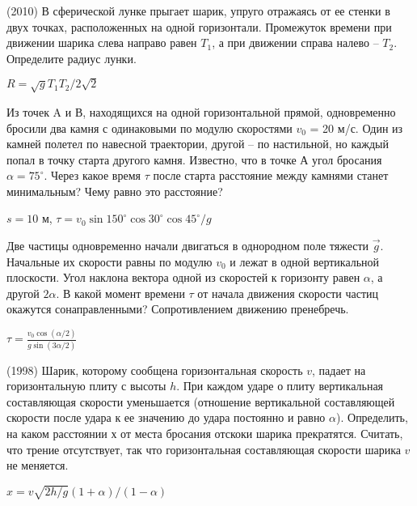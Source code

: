 \begin{ex}
(2010) В сферической лунке прыгает шарик, упруго отражаясь от ее стенки в двух точках, расположенных на одной горизонтали. Промежуток времени при движении шарика слева направо равен $T_{1}$, а при движении справа налево -- $T_2$. Определите радиус лунки.
\begin{ans}
$R = \sqrt{g} T_1 T_2 /2\sqrt{2}$
\end{ans}
\end{ex}

\begin{ex}
Из точек A и В, находящихся на одной горизонтальной прямой, одновременно бросили два камня с одинаковыми по модулю скоростями $v_0$ = 20 м/с. 
Один из камней полетел по навесной траектории, другой -- по настильной, но каждый попал в точку старта другого камня. 
Известно, что в точке А угол бросания $\alpha = 75^{\circ}$. 
Через какое время $\tau$ после старта расстояние между камнями станет минимальным? Чему равно это расстояние?
\begin{ans}
$s = 10$ м, $\tau = v_0 \sin 150^{\circ} \cos 30^{\circ} \cos 45^{\circ} /g$
\end{ans}
\end{ex}

\begin{ex}
Две частицы одновременно начали двигаться в однородном поле тяжести $\vec g$. Начальные их скорости равны по модулю $v_0$ и лежат в одной вертикальной плоскости. Угол наклона вектора одной из скоростей к горизонту равен $\alpha$, а другой $2\alpha$. В какой момент времени $\tau$ от начала движения скорости частиц окажутся сонаправленными? Сопротивлением движению пренебречь.
\begin{ans}
$\tau = \frac{v_0 \cos (\alpha /2)}{g \sin (3\alpha / 2)}$
\end{ans}
\end{ex}

\begin{ex}
(1998) Шарик, которому сообщена горизонтальная скорость $v$, падает на горизонтальную плиту с высоты $h$. При каждом ударе о плиту вертикальная составляющая скорости уменьшается (отношение вертикальной составляющей скорости после удара к ее значению до удара постоянно и равно $\alpha$). Определить, на каком расстоянии $х$ от места бросания отскоки шарика прекратятся. Считать, что трение отсутствует, так что горизонтальная составляющая скорости шарика $v$ не меняется.
\begin{ans}
$x = v \sqrt{2h/g} \left( 1 + \alpha \right) / \left( 1 - \alpha \right)$
\end{ans}
\end{ex}